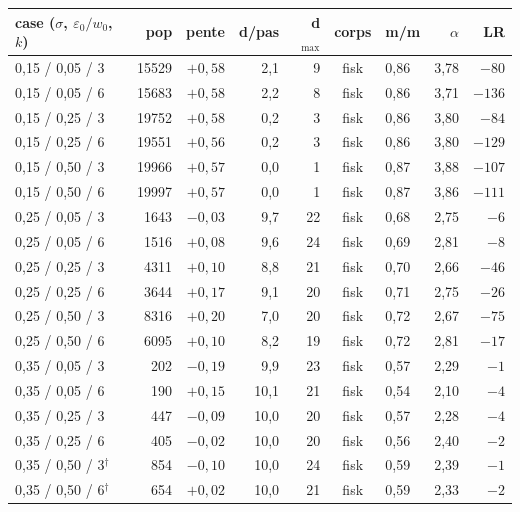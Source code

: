 \documentclass[11pt,a4paper]{article}
\begin{document}
\begin{center}
\scriptsize
\begin{tabular}{lrrrrclrr}
\toprule
case ($\sigma$, $\varepsilon_0/w_0$, $k$) & pop & pente & d/pas & d$_{\max}$ & corps & m/m & $\alpha$ & LR \\
\midrule
0,15 / 0,05 / 3 & 15529 & $+0{,}58$ & 2,1 & 9 & fisk & 0,86 & 3,78 & $-80$ \\
0,15 / 0,05 / 6 & 15683 & $+0{,}58$ & 2,2 & 8 & fisk & 0,86 & 3,71 & $-136$ \\
0,15 / 0,25 / 3 & 19752 & $+0{,}58$ & 0,2 & 3 & fisk & 0,86 & 3,80 & $-84$ \\
0,15 / 0,25 / 6 & 19551 & $+0{,}56$ & 0,2 & 3 & fisk & 0,86 & 3,80 & $-129$ \\
0,15 / 0,50 / 3 & 19966 & $+0{,}57$ & 0,0 & 1 & fisk & 0,87 & 3,88 & $-107$ \\
0,15 / 0,50 / 6 & 19997 & $+0{,}57$ & 0,0 & 1 & fisk & 0,87 & 3,86 & $-111$ \\
0,25 / 0,05 / 3 & 1643 & $-0{,}03$ & 9,7 & 22 & fisk & 0,68 & 2,75 & $-6$ \\
0,25 / 0,05 / 6 & 1516 & $+0{,}08$ & 9,6 & 24 & fisk & 0,69 & 2,81 & $-8$ \\
0,25 / 0,25 / 3 & 4311 & $+0{,}10$ & 8,8 & 21 & fisk & 0,70 & 2,66 & $-46$ \\
0,25 / 0,25 / 6 & 3644 & $+0{,}17$ & 9,1 & 20 & fisk & 0,71 & 2,75 & $-26$ \\
0,25 / 0,50 / 3 & 8316 & $+0{,}20$ & 7,0 & 20 & fisk & 0,72 & 2,67 & $-75$ \\
0,25 / 0,50 / 6 & 6095 & $+0{,}10$ & 8,2 & 19 & fisk & 0,72 & 2,81 & $-17$ \\
0,35 / 0,05 / 3 & 202 & $-0{,}19$ & 9,9 & 23 & fisk & 0,57 & 2,29 & $-1$ \\
0,35 / 0,05 / 6 & 190 & $+0{,}15$ & 10,1 & 21 & fisk & 0,54 & 2,10 & $-4$ \\
0,35 / 0,25 / 3 & 447 & $-0{,}09$ & 10,0 & 20 & fisk & 0,57 & 2,28 & $-4$ \\
0,35 / 0,25 / 6 & 405 & $-0{,}02$ & 10,0 & 20 & fisk & 0,56 & 2,40 & $-2$ \\
0,35 / 0,50 / 3$^{\dagger}$ & 854 & $-0{,}10$ & 10,0 & 24 & fisk & 0,59 & 2,39 & $-1$ \\
0,35 / 0,50 / 6$^{\dagger}$ & 654 & $+0{,}02$ & 10,0 & 21 & fisk & 0,59 & 2,33 & $-2$ \\
\bottomrule
\end{tabular}
\end{center}
\end{document}
